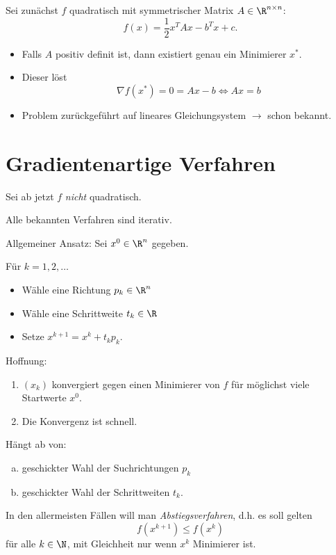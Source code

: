 Sei zunächst $f$ quadratisch mit symmetrischer Matrix $A \in \R^{n \times n}$:
\begin{equation*}
 f(x)=\frac{1}{2}x^TAx-b^Tx+c.
\end{equation*}
\begin{itemize}
 \item Falls $A$ positiv definit ist, dann existiert genau ein Minimierer $x^*$.
 \item Dieser löst
  \begin{equation*}
   \nabla f (x^* )=0=Ax-b \iff Ax=b
  \end{equation*}
 \item Problem zurückgeführt auf lineares Gleichungsystem $\rightarrow$ schon bekannt.
\end{itemize}

\section{Gradientenartige Verfahren}

Sei ab jetzt $f$ \emph{nicht} quadratisch.

\medskip

Alle bekannten Verfahren sind iterativ.

Allgemeiner Ansatz: Sei $x^0 \in \R^n$ gegeben.

Für $k=1,2,\ldots$
\begin{itemize}
	\item Wähle eine Richtung $p_k \in \R^n$
	\item Wähle eine Schrittweite $t_k \in \R$
	\item Setze $x^{k+1}=x^k+t_kp_k$.
\end{itemize}
Hoffnung:
\begin{enumerate}
 \item $(x_k)$ konvergiert gegen einen Minimierer von $f$ für möglichst viele Startwerte $x^0$.
 \item Die Konvergenz ist schnell.
\end{enumerate}
Hängt ab von:
\begin{enumerate}[a)]
 \item geschickter Wahl der Suchrichtungen $p_k$
 \item geschickter Wahl der Schrittweiten $t_k$.
\end{enumerate}
In den allermeisten Fällen will man \emph{Abstiegsverfahren}, d.h. es soll gelten
\begin{equation*}
 f (x^{k+1} ) \leq f (x^k)
\end{equation*}
für alle $k \in \N$, mit Gleichheit nur wenn $x^k$ Minimierer ist.


